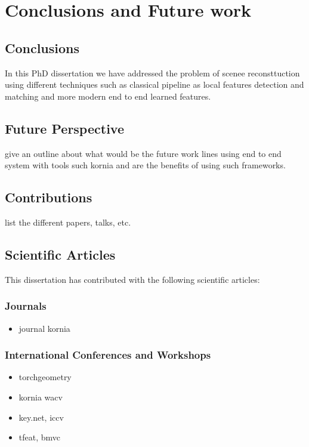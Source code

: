 
\chapter{Conclusions and Future work}
\label{chap:end}

\section{Conclusions}

In this PhD dissertation we have addressed the problem of scenee reconsttuction using different techniques such as classical pipeline as local features detection and matching and more modern end to end learned features. 

\section{Future Perspective}

give an outline about what would be the future work lines using end to end system with tools such kornia and are the benefits of using such frameworks.

\section{Contributions}

list the different papers, talks, etc.

\section{Scientific Articles}

This dissertation has contributed with the following scientific articles:

\subsection{Journals}
\begin{itemize}
\item journal kornia
\end{itemize}

\subsection{International Conferences and Workshops}
\begin{itemize}
\item torchgeometry
\item kornia wacv
\item key.net, iccv
\item tfeat, bmvc
\end{itemize}

